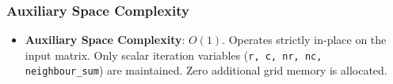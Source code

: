 \subsubsection{Auxiliary Space Complexity}
\begin{itemize}
    \item \textbf{Auxiliary Space Complexity}: $O(1)$.
    Operates strictly in-place on the input matrix. Only scalar iteration variables (\texttt{r, c, nr, nc, neighbour\_sum}) are maintained. Zero additional grid memory is allocated.
\end{itemize}
